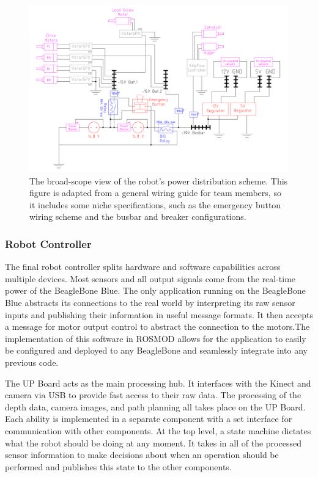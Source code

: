 \documentclass[class=article, crop=false]{standalone}
\begin{document}
	\FloatBarrier
	\begin{figure}[h]
	\centering
	 \includegraphics[width=1\linewidth]{09_Figures/power-distribution.jpg}
	 \caption{The broad-scope view of the robot’s power distribution scheme. This figure is adapted from a general wiring guide for team members, so it includes some niche specifications, such as the emergency button wiring scheme and the busbar and breaker configurations.}
	 \label{fig:power-dist}
	\end{figure}
	\FloatBarrier
	
	
	\subsubsection{Robot Controller}
	
	The final robot controller splits hardware and software capabilities across multiple devices. Most sensors and all output signals come from the real-time power of the BeagleBone Blue. The only application running on the BeagleBone Blue abstracts its connections to the real world by interpreting its raw sensor inputs and publishing their information in useful message formats. It then accepts a message for motor output control to abstract the connection to the motors.The implementation of this software in ROSMOD allows for the application to easily be configured and deployed to any BeagleBone and seamlessly integrate into any previous code.
	
	The UP Board acts as the main processing hub. It interfaces with the Kinect and camera via USB to provide fast access to their raw data. The processing of the depth data, camera images, and path planning all takes place on the UP Board. Each ability is implemented in a separate component with a set interface for communication with other components. At the top level, a state machine dictates what the robot should be doing at any moment. It takes in all of the processed sensor information to make decisions about when an operation should be performed and publishes this state to the other components.
	
\end{document}
